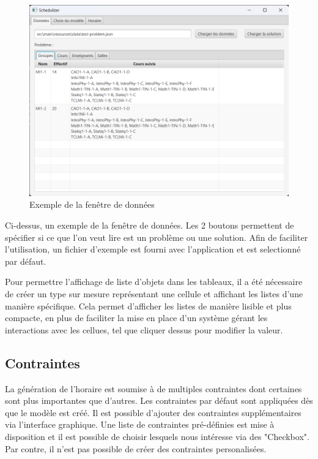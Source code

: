 \begin{figure}[H]
    \centering
    \includegraphics[width=1\textwidth]{./assets/figures/dataWindow.png}
    \caption{Exemple de la fenêtre de données}
\end{figure}

Ci-dessus, un exemple de la fenêtre de données. Les 2 boutons permettent de spécifier si ce que l'on veut lire est un problème ou une solution. Afin de faciliter l'utilisation, un fichier d'exemple est fourni avec l'application et est selectionné par défaut.

Pour permettre l'affichage de liste d'objets dans les tableaux, il a été nécessaire de créer un type sur mesure représentant une cellule et affichant les listes d'une manière spécifique. Cela permet d'afficher les listes de manière  lisible et plus compacte, en plus de faciliter la mise en place d'un système gérant les interactions avec les cellues, tel que cliquer dessus pour modifier la valeur.

\subsection{Contraintes}

La génération de l'horaire est soumise à de multiples contraintes dont certaines sont plus importantes que d'autres. Les contraintes par défaut sont appliquées dès que le modèle est créé. Il est possible d'ajouter des contraintes supplémentaires via l'interface graphique. Une liste de contraintes pré-définies est mise à disposition et il est possible de choisir lesquels nous intéresse via des "Checkbox". Par contre, il n'est pas possible de créer des contraintes personalisées.

